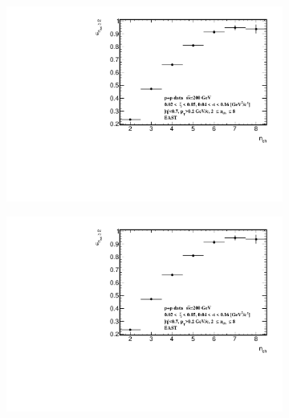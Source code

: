 \begin{figure}[h!]
	\centering
	\begin{subfigure}{.49\textwidth}
		\includegraphics[width=\textwidth,page=77]{chapters/chrgSTAR/img/syst/outSD.pdf}
	\end{subfigure}
	\begin{subfigure}{.49\textwidth}
		\includegraphics[width=\textwidth,page=89]{chapters/chrgSTAR/img/syst/outSD.pdf}
	\end{subfigure}
	\begin{subfigure}{.49\textwidth}

\end{subfigure}
\end{figure}
